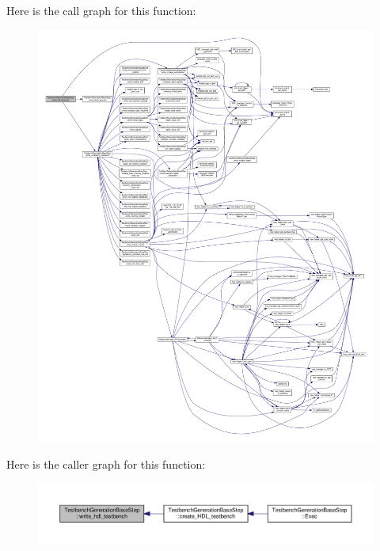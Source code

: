 Here is the call graph for this function\+:
\nopagebreak
\begin{figure}[H]
\begin{center}
\leavevmode
\includegraphics[width=350pt]{dc/d02/classTestbenchGenerationBaseStep_af70241181e695727fd672f4e5fb490a1_cgraph}
\end{center}
\end{figure}
Here is the caller graph for this function\+:
\nopagebreak
\begin{figure}[H]
\begin{center}
\leavevmode
\includegraphics[width=350pt]{dc/d02/classTestbenchGenerationBaseStep_af70241181e695727fd672f4e5fb490a1_icgraph}
\end{center}
\end{figure}
\mbox{\label{classTestbenchGenerationBaseStep_a06ab878cf08dd36fd8273fe4ffcca9d5}} 
